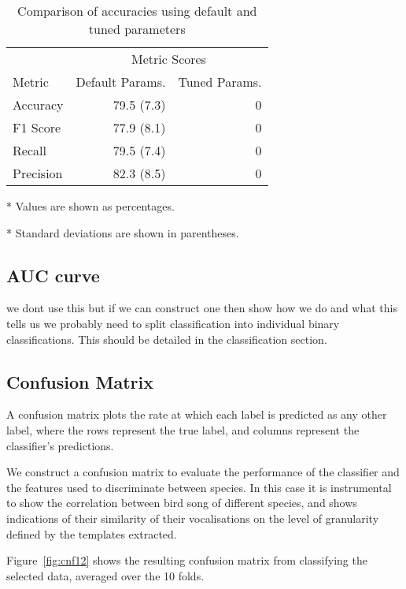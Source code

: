 \begin{table}
  \centering
  \caption{Comparison of accuracies using default and tuned parameters}
  \label{tbl:acc_before_after}
  \begin{threeparttable}
    \begin{tabular}{l r r}
      & \multicolumn{2}{c}{Metric Scores} \\
      Metric    & Default Params. & Tuned Params. \\ \hline
      Accuracy  & 79.5 (7.3) & 0 \\
      F1 Score  & 77.9 (8.1) & 0 \\
      Recall    & 79.5 (7.4) & 0 \\
      Precision & 82.3 (8.5) & 0
    \end{tabular}
    \begin{tablenotes}
      \footnotesize
      \item[*] Values are shown as percentages.
      \item[*] Standard deviations are shown in parentheses.
    \end{tablenotes}
  \end{threeparttable}
\end{table}

\subsection{AUC curve}
we dont use this but if we can construct one then show how we do and what
this tells us
we probably need to split classification into individual binary classifications.
This should be detailed in the classification section.

\subsection{Confusion Matrix}
A confusion matrix plots the rate at which each label is predicted as any other
label, where the rows represent the true label, and columns represent the
classifier's predictions.

We construct a confusion matrix to evaluate the performance of the classifier
and the features used to discriminate between species.
In this case it is instrumental to show the correlation between bird song of
different species, and shows indications of their similarity of their
vocalisations on the level of granularity defined by the templates extracted.

Figure~\ref{fig:cnf12} shows the resulting confusion matrix from classifying the
selected data, averaged over the 10 folds.


